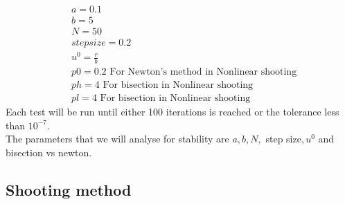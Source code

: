 \documentclass{article}
\begin{document}
\begin{align*}
 & a = 0.1 \\
 & b = 5 \\
 & N = 50 \\
 & step size = 0.2 \\
 & u^0 = \frac{r}{b} \\
 & p0 = 0.2 \text{ \ \ \ \ For Newton's method in Nonlinear   shooting}\\
 & ph = 4 \text{ \ \ \ \ For bisection in Nonlinear shooting}\\
 & pl = 4 \text{ \ \ \ \ For bisection in Nonlinear shooting}
\end{align*}
Each test will be run until either 100 iterations is reached or the tolerance less than $10^{-7}$. \\
The parameters that we will analyse for stability are $a,b,N,$ step size$,u^0$ and bisection vs newton.
\subsection{Shooting method}
\end{document}
